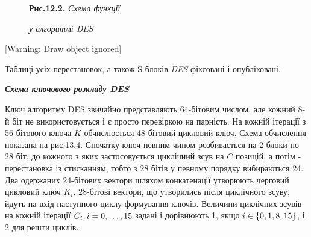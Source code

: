 \begin{figure}
\centering
\begin{minipage}{2.6437in}
{\centering
\textbf{Рис.12.2. }\textit{Схема функції } $ $
\par}

{\centering\itshape
у алгоритмі DES
\par}
\end{minipage}
\end{figure}

\bigskip

[Warning: Draw object ignored]


\bigskip


\bigskip


\bigskip


\bigskip


\bigskip


\bigskip


\bigskip


\bigskip


\bigskip


\bigskip


\bigskip

Таблиці усіх перестановок, а також S-блоків \textit{DES} фіксовані і
опубліковані.


\bigskip

{\centering\bfseries\itshape
Схема ключового розкладу DES
\par}


\bigskip

  Ключ алгоритму DES звичайно представляють 64-бітовим числом, але  кожний 8-й
біт не використовується і є просто перевіркою на парність. На кожній ітерації з
56-бітового ключа  $K$\textit{ }обчислюється 48-бітовий цикловий ключ. Схема
обчислення показана на рис.13.4. Спочатку ключ певним чином розбивається на 2
блоки по 28 біт, до кожного з яких застосовується циклічний зсув на  $C$
позицій, а потім - перестановка із стисканням, тобто  з 28 бітів у певному
порядку вибираються 24. Два одержаних 24-бітових вектори шляхом конкатенації
утворюють черговий цикловий ключ  $K_i$. 28-бітові вектори, що утворились
після циклічного зсуву, йдуть на вхід наступного циклу формування ключів.
Величини циклічних зсувів на кожній ітерації 
$C_{i},i=0,\dots,\text15$ задані і дорівнюють 1, якщо 
$i\in \left\{ 0,1,8,\text15 \right\}$, і 2 для решти циклів.

